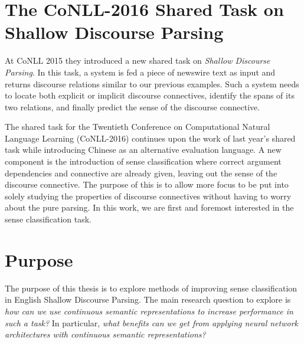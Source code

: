 \section{The CoNLL-2016 Shared Task on Shallow Discourse Parsing}

At CoNLL 2015 they introduced a new shared task on \emph{Shallow Discourse Parsing}. In this task, a system is fed a piece of newswire text as input and returns discourse relations similar to our previous examples. Such a system needs to locate both explicit or implicit discourse connectives, identify the spans of its two relations, and finally predict the sense of the discourse connective.

The shared task for the Twentieth Conference on Computational Natural Language Learning (CoNLL-2016) continues upon the work of last year's shared task while introducing Chinese as an alternative evaluation language. A new component is the introduction of sense classification where correct argument dependencies and connective are already given, leaving out the sense of the discourse connective. The purpose of this is to allow more focus to be put into solely studying the properties of discourse connectives without having to worry about the pure parsing. In this work, we are first and foremost interested in the sense classification task.

\section{Purpose}

The purpose of this thesis is to explore methods of improving sense classification in English Shallow Discourse Parsing. The main research question to explore is \emph{how can we use continuous semantic representations to increase performance in such a task?} In particular, \emph{what benefits can we get from applying neural network architectures with continuous semantic representations?}
